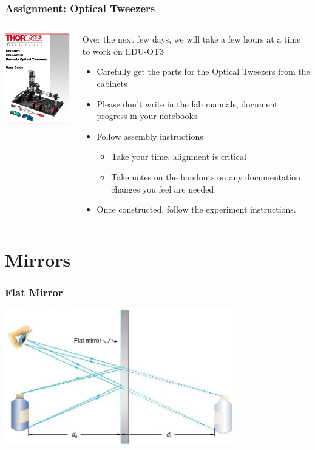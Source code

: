 \documentclass{beamer}
\begin{document}
\begin{frame}\frametitle{Assignment: Optical Tweezers}
\begin{columns}
\begin{column}{4cm}
\begin{center}
\includegraphics[width=4cm]{fig/ot3.jpg}
\end{center}
\end{column}
\begin{column}{7cm}
Over the next few days, we will take a few hours at a time to work on EDU-OT3
\begin{itemize}
\item Carefully get the parts for the Optical Tweezers from the cabinets
\item Please don't write in the lab manuals, document progress in your notebooks.
\item Follow assembly instructions
\begin{itemize}
\item Take your time, alignment is critical
\item Take notes on the handouts on any documentation changes you feel are needed
\end{itemize}
\item Once constructed, follow the experiment instructions.
\end{itemize}
\end{column}
\end{columns}
\end{frame}



\section{Mirrors}

\begin{frame}\frametitle{Flat Mirror}

\begin{center}
\includegraphics[width=10cm]{fig/mirrorimage1.jpg}
\end{center}

\end{frame}
\end{document}
